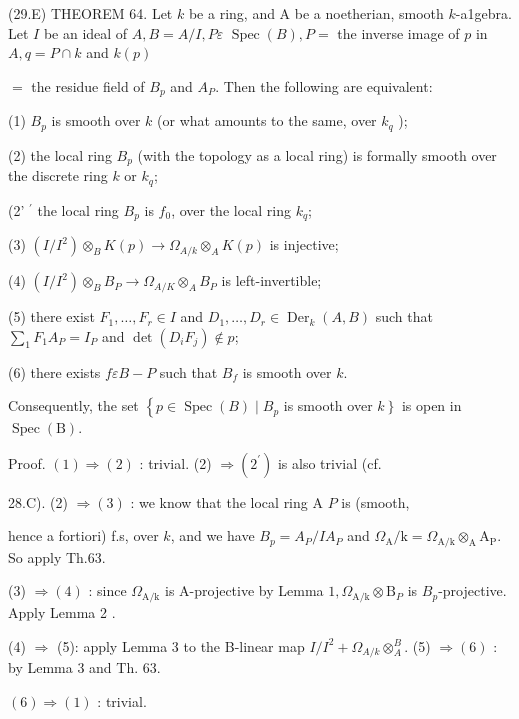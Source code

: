 (29.E) THEOREM 64. Let $k$ be a ring, and A be a noetherian, smooth $k$-a1gebra. Let $I$ be an ideal of $A, B=A / I, P \varepsilon$ $\operatorname{Spec}(B), P=$ the inverse image of $p$ in $A, q=P \cap k$ and $k(p)$

$=$ the residue field of $B_{p}$ and $A_{P}$. Then the following are equivalent:

(1) $B_{p}$ is smooth over $k$ (or what amounts to the same, over $k_{q}$ );

(2) the local ring $B_{p}$ (with the topology as a local ring) is formally smooth over the discrete ring $k$ or $k_{q}$;

(2' $^{\prime}$ the local ring $B_{p}$ is $f_{0}$, over the local ring $k_{q}$;

(3) $\left(I / I^{2}\right) \otimes_{B} K(p) \rightarrow \Omega_{A / k} \otimes_{A} K(p)$ is injective;

(4) $\left(I / I^{2}\right) \otimes_{B} B_{P} \rightarrow \Omega_{A / K} \otimes_{A} B_{P}$ is left-invertible;

(5) there exist $F_{1}, \ldots, F_{r} \in I$ and $D_{1}, \ldots, D_{r} \in \operatorname{Der}_{k}(A, B)$ such that $\sum_{1} F_{1} A_{P}=I_{P}$ and $\operatorname{det}\left(D_{i} F_{j}\right) \notin p$;

(6) there exists $f \varepsilon B-P$ such that $B_{f}$ is smooth over $k$.

Consequently, the set $\left\{p \in \operatorname{Spec}(B) \mid B_{p}\right.$ is smooth over $\left.k\right\}$ is open in $\operatorname{Spec}(\mathrm{B})$.

Proof. $(1) \Rightarrow(2)$ : trivial. (2) $\Rightarrow\left(2^{\prime}\right)$ is also trivial (cf.

28.C). (2) $\Rightarrow(3)$ : we know that the local ring A $P$ is (smooth,

hence a fortiori) f.s, over $k$, and we have $B_{p}=A_{P} / I A_{P}$ and $\Omega_{\mathrm{A}} / \mathrm{k}=\Omega_{\mathrm{A} / \mathrm{k}} \otimes_{\mathrm{A}} \mathrm{A}_{\mathrm{P}}$. So apply Th.63.

(3) $\Rightarrow(4)$ : since $\Omega_{\mathrm{A} / \mathrm{k}}$ is A-projective by Lemma $1, \Omega_{\mathrm{A} / \mathrm{k}} \otimes \mathrm{B}_{P}$ is $B_{p}$-projective. Apply Lemma 2 .

(4) $\Rightarrow$ (5): apply Lemma 3 to the B-linear map $I / I^{2}+\Omega_{A / k} \otimes_{A}^{B}$. (5) $\Rightarrow(6)$ : by Lemma 3 and Th. $63 .$

$(6) \Rightarrow(1)$ : trivial.

